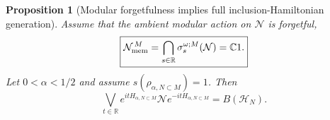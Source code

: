 \documentclass[a4paper,11pt]{article}
\newtheorem{proposition}[theorem]{Proposition}
\theoremstyle{definition}
\begin{document}
\begin{proposition}[Modular forgetfulness implies full inclusion-Hamiltonian generation]
\label{prop:Halpha-full-generation}
Assume that the ambient modular action on $\mathcal N$ is forgetful,
\begin{equation}
    \boxed{
    \mathcal N_{\rm mem}^{\,M}
    =
    \bigcap_{s\in\mathbb R}
    \sigma_s^{\omega;M}(\mathcal N)
    =
    \mathbb C1.
    }
    \label{eq:ambient-forgetful-probing}
\end{equation}
Let $0<\alpha<1/2$ and assume
$s(\rho_{\alpha,N\subset M})=1$. Then
\begin{equation}
    \boxed{
    \bigvee_{t\in\mathbb R}
    e^{itH_{\alpha,N\subset M}}
    \mathcal N
    e^{-itH_{\alpha,N\subset M}}
    =
    B(\mathcal H_N).
    }
    \label{eq:Halpha-full-BHN}
\end{equation}
\end{proposition}
\end{document}
